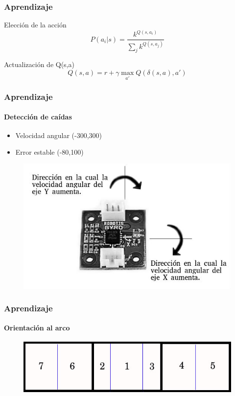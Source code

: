 \documentclass{beamer}
\begin{document}
\begin{frame}
\frametitle{Aprendizaje}

\begin{block}{Elecci\'on de la acci\'on}
\begin{equation}
 P(a_{i} | s) = \dfrac{k^{Q(s,a_{i})}}{\sum_{j}k^{Q(s,a_{j})}}
\end{equation}
\end{block} 

\begin{block}{Actualizaci\'on de Q(s,a)}
\begin{equation}
Q (s,a) = r + {\gamma\max_{a'}} Q(\delta(s ,a ) , a') 
\end{equation}
\end{block}

\end{frame}




\begin{frame}
\frametitle{Aprendizaje}
\framesubtitle{Detecci\'on de ca\'idas}

\begin{itemize}
 \item Velocidad angular (-300,300)
 \item Error estable (-80,100)
\end{itemize}

\begin{figure}[hbtp]
\centering
\includegraphics[scale=0.3]{gyroDireccion.jpg} 
\end{figure}

\end{frame}



\begin{frame}
\frametitle{Aprendizaje}
\framesubtitle{Orientaci\'on al arco}

\begin{figure}[hbtp]
\centering
\includegraphics[scale=0.4]{RegionesArco.jpg} 
\end{figure}

\end{frame}
\end{document}
